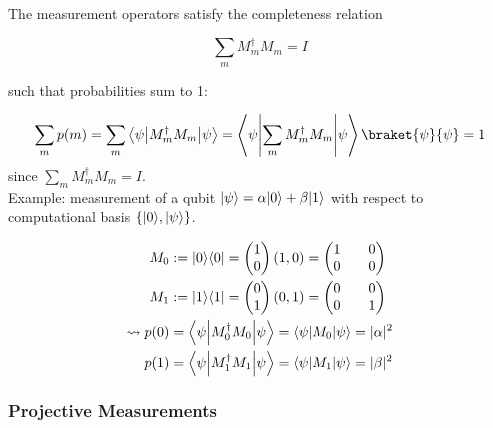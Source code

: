 The measurement operators satisfy the completeness relation

\begin{equation}
    \sum_m M_m^\dag M_m = I
\end{equation}

such that probabilities sum to 1:

\begin{equation}
    \sum_m p(m) 
        = \sum_m \braketmatrix{\psi}{M_m^\dag M_m}{\psi} 
        = \braketmatrix{\psi}{\sum_m M_m^\dag M_m}{\psi} \braket{\psi}{\psi} 
        = 1
\end{equation}
since $\sum_m M_m^\dag M_m = I$. \\
\newline
%
Example: measurement of a qubit $\lvert\psi\rangle = \alpha \lvert0\rangle + \beta \lvert1\rangle$
with respect to computational basis $\{\lvert0\rangle, \lvert\psi\rangle\}$.

\begin{align*}
    M_0 &:= \ket{0} \bra{0} = \begin{pmatrix*}1 \\ 0\end{pmatrix*} (1, 0) = \begin{pmatrix*}
        1 && 0 \\ 0 && 0
    \end{pmatrix*} \\
    M_1 &:= \ket{1} \bra{1} = \begin{pmatrix*}0 \\ 1\end{pmatrix*} (0, 1) = \begin{pmatrix*}
        0 && 0 \\ 0 && 1
    \end{pmatrix*} \\
    \leadsto p(0) &= \braketmatrix{\psi}{M_0^\dag M_0}{\psi} = \braketmatrix{\psi}{M_0}{\psi} = \abs{\alpha}^2 \\
    p(1) &= \braketmatrix{\psi}{M_1^\dag M_1}{\psi} = \braketmatrix{\psi}{M_1}{\psi} = \abs{\beta}^2 \\
\end{align*}

\subsubsection{Projective Measurements}